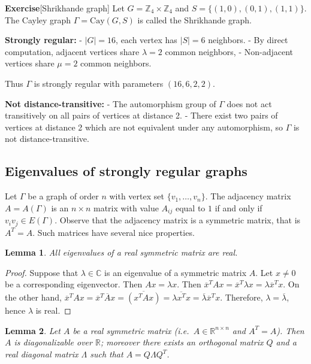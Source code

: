 \documentclass[12pt,a4paper,openany]{book}
\newtheorem{lemma}{Lemma}[section]
\begin{document}
\bigskip\noindent\textbf{Exercise}[Shrikhande graph]
Let $G = \mathbb{Z}_4 \times \mathbb{Z}_4$ and $S = \{(1,0),(0,1),(1,1)\}$.  
The Cayley graph $\Gamma = \text{Cay}(G,S)$ is called the Shrikhande graph.

\medskip
\noindent
\textbf{Strongly regular:}  
- $|G| = 16$, each vertex has $|S|=6$ neighbors.  
- By direct computation, adjacent vertices share $\lambda = 2$ common neighbors,  
- Non-adjacent vertices share $\mu = 2$ common neighbors.  

Thus $\Gamma$ is strongly regular with parameters $(16,6,2,2)$.  

\medskip
\noindent
\textbf{Not distance-transitive:}  
- The automorphism group of $\Gamma$ does not act transitively on all pairs of vertices at distance 2.  
- There exist two pairs of vertices at distance 2 which are not equivalent under any automorphism, so $\Gamma$ is not distance-transitive.





\subsection{Eigenvalues of strongly regular graphs}

Let $\Gamma$ be a graph of order $n$ with vertex set $\{v_1, \dots, v_n\}$. The adjacency matrix $A = A(\Gamma)$ is an $n \times n$ matrix with value $A_{ij}$ equal to $1$ if and only if $v_i v_j \in E(\Gamma)$. Observe that the adjacency matrix is a symmetric matrix, that is $A^T = A$. Such matrices have several nice properties.

\begin{lemma}
All eigenvalues of a real symmetric matrix are real.
\end{lemma}

\begin{proof}
Suppose that $\lambda \in \mathbb{C}$ is an eigenvalue of a symmetric matrix $A$. Let $x \neq 0$ be a corresponding eigenvector. Then $Ax = \lambda x$. Then $\overline{x}^T A x = \overline{x}^T \lambda x = \lambda \overline{x}^T x$. On the other hand, $\overline{x}^T A x = \overline{x}^T \overline{A} x = \overline{(x^T A x)} = \overline{\lambda x^T x} = \overline{\lambda} \overline{x}^T x$. Therefore, $\lambda = \overline{\lambda}$, hence $\lambda$ is real.
\end{proof}

\begin{lemma}
Let $A$ be a real symmetric matrix (i.e.\ $A\in\mathbb{R}^{n\times n}$ and
$A^{T}=A$). Then $A$ is diagonalizable over $\mathbb{R}$; moreover there
exists an orthogonal matrix $Q$ and a real diagonal matrix $\Lambda$
such that $A=Q\Lambda Q^{T}$.
\end{lemma}
\end{document}
